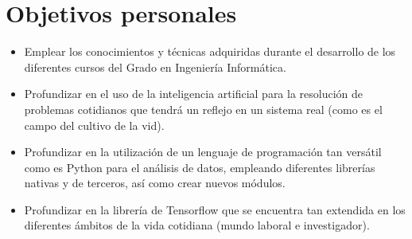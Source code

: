 \section{Objetivos personales}
\begin{itemize}
    \item Emplear los conocimientos y técnicas adquiridas durante el desarrollo de los diferentes
        cursos del Grado en Ingeniería Informática.
    \item Profundizar en el uso de la inteligencia artificial para la resolución de 
        problemas cotidianos que tendrá un reflejo en un sistema real (como es el
        campo del cultivo de la vid).
    \item Profundizar en la utilización de un lenguaje de programación tan versátil
        como es Python para el análisis de datos, empleando diferentes librerías
        nativas y de terceros, así como crear nuevos módulos.
    \item Profundizar en la librería de Tensorflow que se encuentra tan extendida
        en los diferentes ámbitos de la vida cotidiana (mundo laboral e investigador). 
\end{itemize}